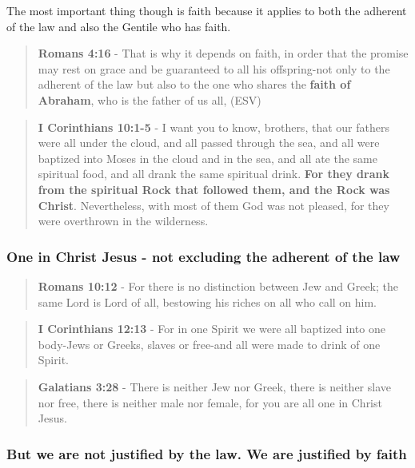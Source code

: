 \documentclass[11pt]{article}
\begin{document}
The most important thing though is faith because it applies to both the adherent of the law and also the Gentile who has faith.

\begin{quote}
\textbf{Romans 4:16} - That is why it depends on faith, in order that the promise may rest on grace and be guaranteed to all his offspring-not only to the adherent of the law but also to the one who shares the \textbf{faith of Abraham}, who is the father of us all, (ESV)
\end{quote}

\begin{quote}
\textbf{I Corinthians 10:1-5} - I want you to know, brothers, that our fathers were all under the cloud, and all passed through the sea, and all were baptized into Moses in the cloud and in the sea, and all ate the same spiritual food, and all drank the same spiritual drink. \textbf{For they drank from the spiritual Rock that followed them, and the Rock was Christ}. Nevertheless, with most of them God was not pleased, for they were overthrown in the wilderness.
\end{quote}

\subsubsection{One in Christ Jesus - not excluding the adherent of the law}
\label{sec:org7f702ab}

\begin{quote}
\textbf{Romans 10:12} - For there is no distinction between Jew and Greek; the same Lord is Lord of all, bestowing his riches on all who call on him.
\end{quote}

\begin{quote}
\textbf{I Corinthians 12:13} - For in one Spirit we were all baptized into one body-Jews or Greeks, slaves or free-and all were made to drink of one Spirit.
\end{quote}

\begin{quote}
\textbf{Galatians 3:28} - There is neither Jew nor Greek, there is neither slave nor free, there is neither male nor female, for you are all one in Christ Jesus.
\end{quote}

\subsubsection{But we are not justified by the law. We are justified by faith}
\label{sec:org628865a}
\end{document}
